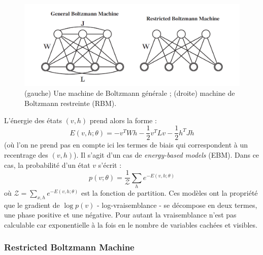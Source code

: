 \documentclass[10pt,a4paper]{article}
\begin{document}
\begin{figure}[ht!]
\centering
\includegraphics[width = \columnwidth]{fig/boltzmann_machine.png}
\caption{(gauche) Une machine de Boltzmann générale ; (droite) machine de Boltzmann restreinte (RBM).}
\label{fig3}
\end{figure}

L'énergie des états $(v,h)$ prend alors la forme : 
\begin{equation}
E(v,h ; \theta) = -v^TWh - \frac{1}{2}v^TLv - \frac{1}{2}h^T Jh
\end{equation}
(où l'on ne prend pas en compte ici les termes de biais qui correspondent à un recentrage des $(v,h)$). Il s'agit d'un cas de \emph{energy-based models} (EBM). Dans ce cas, la probabilité d'un état $v$ s'écrit : 
\begin{equation}
p(v;\theta) = \frac{1}{\mathcal{Z}}\sum_h e^{-E(v,h;\theta)}
\end{equation}
où $\mathcal{Z} = \sum_{x,h}e^{-E(v,h;\theta)}$ est la fonction de partition. Ces modèles ont la propriété que le gradient de $\log p(v)$ - log-vraisemblance - se décompose en deux termes, une phase positive et une négative. Pour autant la vraisemblance n'est pas calculable car exponentielle à la fois en le nombre de variables cachées et visibles. 



\subsubsection{Restricted Boltzmann Machine}
\end{document}
